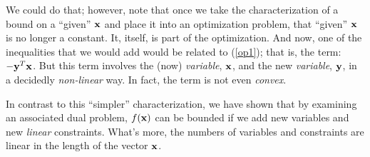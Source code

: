 \documentclass[12pt]{article}
\begin{document}
We could do that; however, note that once we take the characterization of a 
bound on a ``given'' ${\bf x}$ and place it into an optimization problem, that 
``given'' ${\bf x}$ is no longer a constant. It, itself, is part of the 
optimization. And now, one of the inequalities that we would add
would be related to (\ref{op1}); that is, the term: $-{\bf y}^T {\bf x}$. But 
this term involves the (now) {\it variable\/}, ${\bf x}$, and the new 
{\it variable\/}, ${\bf y}$, in a decidedly {\it non-linear\/} way.
In fact, the term is not even {\it convex\/}.

In contrast to this ``simpler'' characterization, we have shown that 
by examining an associated dual problem, $f({\bf x})$ can be bounded if we 
add new variables and new {\it linear\/} constraints.
What's more, the numbers of variables and constraints are linear in the length 
of the vector ${\bf x}$.
\end{document}
